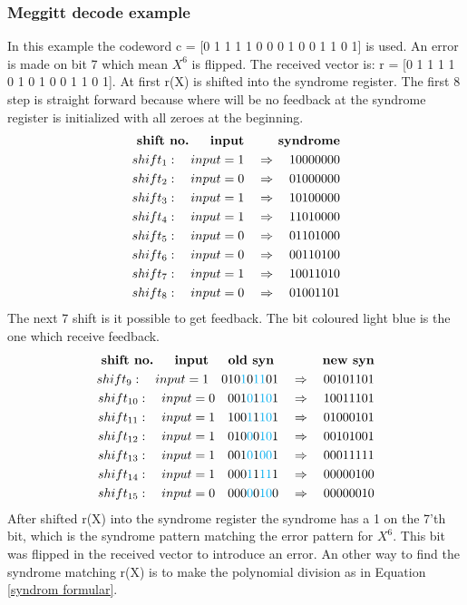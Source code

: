 \documentclass[Main]{subfiles}
\begin{document}
\subsubsection{Meggitt decode example}
In this example the codeword c = [0 1 1 1 1 0 0 0 1 0 0 1 1 0 1] is used.
An error is made on bit 7 which mean $X^6$ is flipped.
The received vector is: r = [0 1 1 1 1 0 {\color{red}1} 0 1 0 0 1 1 0 1].
At first r(X) is shifted into the syndrome register.
The first 8 step is straight forward because where will be no feedback at the syndrome register is initialized with all zeroes at the beginning.
\begin{eqnarray*}
\textbf{shift no. \quad	input \qquad syndrome}\\
shift_1: \quad input = 1 \quad \Rightarrow \quad 10000000\\
shift_2: \quad input = 0 \quad \Rightarrow \quad 01000000\\
shift_3: \quad input = 1 \quad \Rightarrow \quad 10100000\\
shift_4: \quad input = 1 \quad \Rightarrow \quad 11010000\\
shift_5: \quad input = 0 \quad \Rightarrow \quad 01101000\\
shift_6: \quad input = 0 \quad \Rightarrow \quad 00110100\\
shift_7: \quad input = 1 \quad \Rightarrow \quad 10011010\\
shift_8: \quad input = 0 \quad \Rightarrow \quad 01001101
\end{eqnarray*}
The next 7 shift is it possible to get feedback.
The bit coloured light blue is the one which receive feedback. 
\begin{eqnarray*}
\textbf{shift no. \quad	input \quad old syn \qquad \quad new syn}\\
shift_9: \quad input = 1 \quad 010{\color{cyan}1}0{\color{cyan}11}01 \quad \Rightarrow \quad 00101101\\
shift_{10}: \quad input = 0 \quad 001{\color{cyan}0}1{\color{cyan}10}1 \quad \Rightarrow \quad 10011101\\
shift_{11}: \quad input = 1 \quad 100{\color{cyan}1}1{\color{cyan}10}1 \quad \Rightarrow \quad 01000101\\
shift_{12}: \quad input = 1 \quad 010{\color{cyan}0}0{\color{cyan}10}1 \quad \Rightarrow \quad 00101001\\
shift_{13}: \quad input = 1 \quad 001{\color{cyan}0}1{\color{cyan}00}1 \quad \Rightarrow \quad 00011111\\
shift_{14}: \quad input = 1 \quad 000{\color{cyan}1}1{\color{cyan}11}1 \quad \Rightarrow \quad 00000100\\
shift_{15}: \quad input = 0 \quad 000{\color{cyan}0}0{\color{cyan}10}0 \quad \Rightarrow \quad 00000010
\end{eqnarray*}
After shifted r(X) into the syndrome register the syndrome has a 1 on the 7'th bit, which is the syndrome pattern matching the error pattern for $X^6$.
This bit was flipped in the received vector to introduce an error.
An other way to find the syndrome matching r(X) is to make the polynomial division as in Equation \ref{syndrom formular}.
\end{document}
